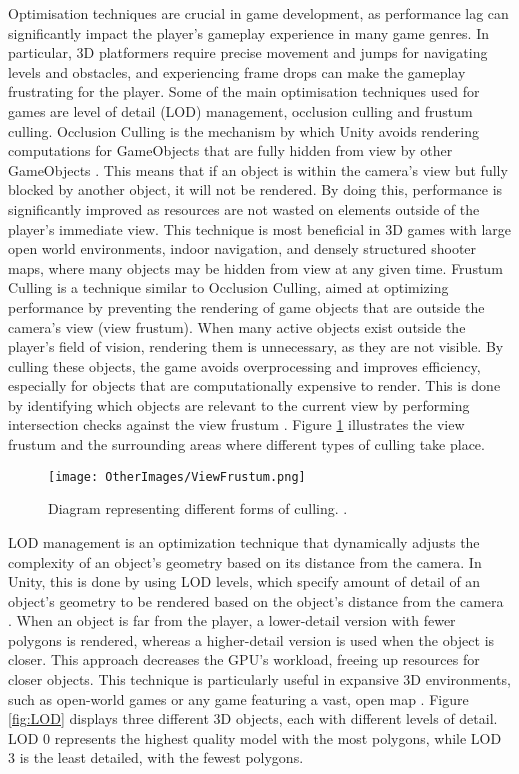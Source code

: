 \documentclass[10pt]{final_report}
\begin{document}
Optimisation techniques are crucial in game development, as performance lag can significantly impact the player's gameplay experience in many game genres. In particular, 3D platformers require precise movement and jumps for navigating levels and obstacles, and experiencing frame drops can make the gameplay frustrating for the player. Some of the main optimisation techniques used for games are level of detail (LOD) management, occlusion culling and frustum culling. \newline
Occlusion Culling is the mechanism by which Unity avoids rendering computations for GameObjects that are fully hidden from view by other GameObjects \cite{Singh2022}. This means that if an object is within the camera's view but fully blocked by another object, it will not be rendered. By doing this, performance is significantly improved as resources are not wasted on elements outside of the player's immediate view. This technique is most beneficial in 3D games with large open world environments, indoor navigation, and densely structured shooter maps, where many objects may be hidden from view at any given time.
\newline
Frustum Culling is a technique similar to Occlusion Culling, aimed at optimizing performance by preventing the rendering of game objects that are outside the camera's view (view frustum). When many active objects exist outside the player's field of vision, rendering them is unnecessary, as they are not visible. By culling these objects, the game avoids overprocessing and improves efficiency, especially for objects that are computationally expensive to render. This is done by identifying which objects are relevant to the current view by performing intersection checks against the view frustum \cite{FC2020}. \newline
Figure \ref{fig:FrustumCulling} illustrates the view frustum and the surrounding areas where different types of culling take place.

\begin{figure}[H]
    \centering
    \texttt{[image: OtherImages/ViewFrustum.png]}
    \caption{Diagram representing different forms of culling. \cite{FC2020}.}
    \label{fig:FrustumCulling}
\end{figure}

LOD management is an optimization technique that dynamically adjusts the complexity of an object's geometry based on its distance from the camera. In Unity, this is done by using LOD levels, which specify amount of detail of an object’s geometry to be rendered based on the object’s distance from the camera \cite{Unity2024LOD}. When an object is far from the player, a lower-detail version with fewer polygons is rendered, whereas a higher-detail version is used when the object is closer. This approach decreases the GPU's workload, freeing up resources for closer objects. This technique is particularly useful in expansive 3D environments, such as open-world games or any game featuring a vast, open map \cite{IndieGamesDevel}. Figure \ref{fig:LOD} displays three different 3D objects, each with different levels of detail. LOD 0 represents the highest quality model with the most polygons, while LOD 3 is the least detailed, with the fewest polygons.
\end{document}

